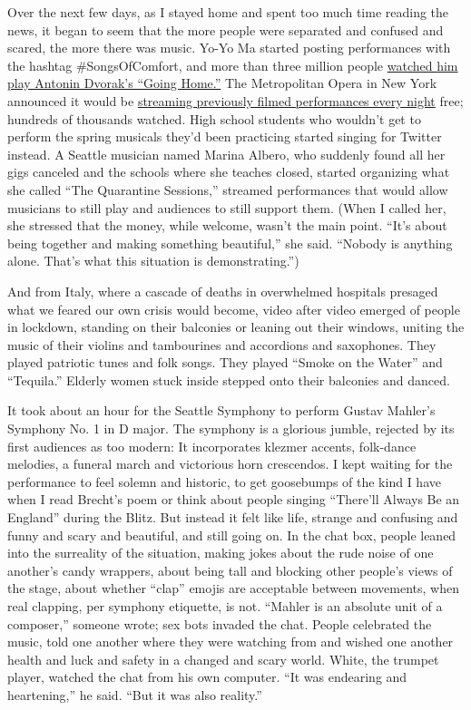 Over the next few days, as I stayed home and spent too much time reading
the news, it began to seem that the more people were separated and
confused and scared, the more there was music. Yo-Yo Ma started posting
performances with the hashtag \#SongsOfComfort, and more than three
million people
\href{https://twitter.com/YoYo_Ma/status/1238572657278431234}{watched
him play Antonin Dvorak's ``Going Home.''} The Metropolitan Opera in New
York announced it would be
\href{https://www.metopera.org/user-information/nightly-met-opera-streams/}{streaming
previously filmed performances every night} free; hundreds of thousands
watched. High school students who wouldn't get to perform the spring
musicals they'd been practicing started singing for Twitter instead. A
Seattle musician named Marina Albero, who suddenly found all her gigs
canceled and the schools where she teaches closed, started organizing
what she called ``The Quarantine Sessions,'' streamed performances that
would allow musicians to still play and audiences to still support them.
(When I called her, she stressed that the money, while welcome, wasn't
the main point. ``It's about being together and making something
beautiful,'' she said. ``Nobody is anything alone. That's what this
situation is demonstrating.'')

And from Italy, where a cascade of deaths in overwhelmed hospitals
presaged what we feared our own crisis would become, video after video
emerged of people in lockdown, standing on their balconies or leaning
out their windows, uniting the music of their violins and tambourines
and accordions and saxophones. They played patriotic tunes and folk
songs. They played ``Smoke on the Water'' and ``Tequila.'' Elderly women
stuck inside stepped onto their balconies and danced.

It took about an hour for the Seattle Symphony to perform Gustav
Mahler's Symphony No. 1 in D major. The symphony is a glorious jumble,
rejected by its first audiences as too modern: It incorporates klezmer
accents, folk-dance melodies, a funeral march and victorious horn
crescendos. I kept waiting for the performance to feel solemn and
historic, to get goosebumps of the kind I have when I read Brecht's poem
or think about people singing ``There'll Always Be an England'' during
the Blitz. But instead it felt like life, strange and confusing and
funny and scary and beautiful, and still going on. In the chat box,
people leaned into the surreality of the situation, making jokes about
the rude noise of one another's candy wrappers, about being tall and
blocking other people's views of the stage, about whether ``clap''
emojis are acceptable between movements, when real clapping, per
symphony etiquette, is not. ``Mahler is an absolute unit of a
composer,'' someone wrote; sex bots invaded the chat. People celebrated
the music, told one another where they were watching from and wished one
another health and luck and safety in a changed and scary world. White,
the trumpet player, watched the chat from his own computer. ``It was
endearing and heartening,'' he said. ``But it was also reality.''

